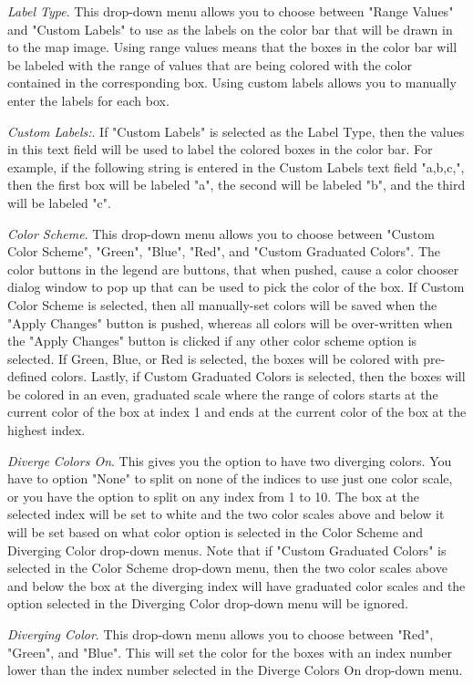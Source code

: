 \emph{Label Type}. This drop-down menu allows 
you to choose between "Range Values" and 
"Custom Labels" to use as the labels on the color bar that will 
be drawn in to the map image. Using range values means that the 
boxes in the color bar will be labeled with the range of values that 
are being colored with the color contained in the corresponding box. 
Using custom labels allows you to manually enter the labels 
for each box.

\emph{Custom Labels:}. If "Custom Labels" is 
selected as the Label Type, then the values 
in this text field will be used to label the colored boxes in the 
color bar. For example, if the following string is entered in 
the Custom Labels text field "a,b,c,", then the first box will 
be labeled "a", the second will be labeled "b", and the third 
will be labeled "c".

\emph{Color Scheme}. This drop-down menu allows you to choose between "Custom Color Scheme", 
"Green", "Blue", "Red", and "Custom Graduated Colors". The color 
buttons in the legend are buttons, that when pushed, cause a color 
chooser dialog window to pop up that can be used to pick the color of 
the box. If Custom Color Scheme is selected, then all manually-set colors 
will be saved when the "Apply Changes" button is pushed, whereas all colors 
will be over-written when the "Apply Changes" button is clicked if any other 
color scheme option is selected. If Green, Blue, or Red is selected, the 
boxes will be colored with pre-defined colors. Lastly, if Custom Graduated 
Colors is selected, then the boxes will be colored in an even, graduated 
scale where the range of colors starts at the current color of the box at 
index 1 and ends at the current color of the box at the highest index.

\emph{Diverge Colors On}. This gives you the option to 
have two diverging colors. You have to option 
"None" to split on none of the indices to use just one color scale, or 
you have the option to split on any index from 1 to 10. The box at the 
selected index will be set to white and the two color scales above and 
below it will be set based on what color option is selected in the Color 
Scheme and Diverging Color drop-down menus. Note that if "Custom Graduated Colors" 
is selected in the Color Scheme drop-down menu, then the two color 
scales above and below the box at the diverging index will have graduated 
color scales and the option selected in the Diverging Color drop-down menu 
will be ignored.

\emph{Diverging Color}. This drop-down menu allows 
you to choose between "Red", "Green", and "Blue".  
This will set the color for the boxes with an index number lower than 
the index number selected in the Diverge Colors On drop-down menu.

